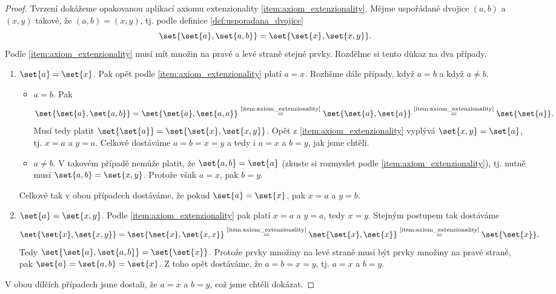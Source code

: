 \begin{proof}
    Tvrzení dokážeme opakovanou aplikací axiomu extenzionality \ref{item:axiom_extenzionality}. Mějme uspořádané dvojice $(a,b)$ a $(x,y)$ takové, že $(a,b)=(x,y)$, tj. podle definice \ref{def:usporadana_dvojice}
    \begin{equation*}
        \set{\set{a},\set{a,b}}=\set{\set{x},\set{x,y}}.
    \end{equation*}
    Podle \ref{item:axiom_extenzionality} musí mít množin na pravé a levé straně stejné prvky. Rozdělme si tento důkaz na dva případy.
    \begin{enumerate}[label=(\alph*)]
        \item $\set{a}=\set{x}$. Pak opět podle \ref{item:axiom_extenzionality} platí $a=x$. Rozlišme dále případy, když $a=b$ a když $a\neq b$.
        \begin{itemize}
            \item $a=b$. Pak
            \begin{equation*}
                \set{\set{a},\set{a,b}}=\set{\set{a},\set{a,a}}\stackrel{\text{\ref{item:axiom_extenzionality}}}{=}\set{\set{a},\set{a}}\stackrel{\text{\ref{item:axiom_extenzionality}}}{=}\set{\set{a}}.
            \end{equation*}
            Musí tedy platit $\set{\set{a}}=\set{\set{x},\set{x,y}}$. Opět z \ref{item:axiom_extenzionality} vyplývá $\set{x,y}=\set{a}$, tj. $x=a$ a $y=a$. Celkově dostáváme $a=b=x=y$ a tedy i $a=x$ a $b=y$, jak jsme chtěli.
            \item $a\neq b$. V takovém případě nemůže platit, že $\set{a,b}=\set{a}$ (zkuste si rozmyslet podle \ref{item:axiom_extenzionality}), tj. nutně musí $\set{a,b}=\set{x,y}$. Protože však $a=x$, pak $b=y$.
        \end{itemize}
        Celkově tak v obou případech dostáváme, že pokud $\set{a}=\set{x}$, pak $x=a$ a $y=b$.
        \item $\set{a}=\set{x,y}$. Podle \ref{item:axiom_extenzionality} pak platí $x=a$ a $y=a$, tedy $x=y$. Stejným postupem tak dostáváme
        \begin{equation*}
            \set{\set{x},\set{x,y}}=\set{\set{x},\set{x,x}}\stackrel{\text{\ref{item:axiom_extenzionality}}}{=}\set{\set{x},\set{x}}\stackrel{\text{\ref{item:axiom_extenzionality}}}{=}\set{\set{x}}.
        \end{equation*}
        Tedy $\set{\set{a},\set{a,b}}=\set{\set{x}}$. Protože prvky množiny na levé straně musí být prvky množiny na pravé straně, pak $\set{a}=\set{a,b}=\set{x}$. Z toho opět dostáváme, že $a=b=x=y$, tj. $a=x$ a $b=y$.
    \end{enumerate}
    V obou dílčích případech jsme dostali, že $a=x$ a $b=y$, což jsme chtěli dokázat.
\end{proof}